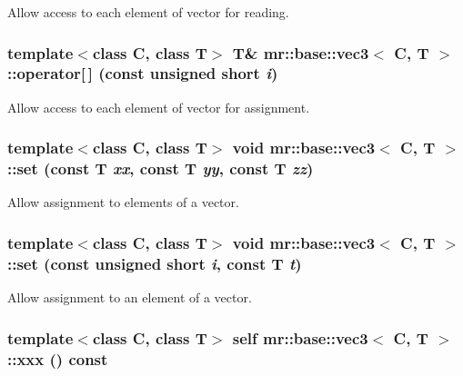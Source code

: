 Allow access to each element of vector for reading. 

\subsubsection{\setlength{\rightskip}{0pt plus 5cm}template$<$class C, class T$>$ T\& {\bf mr::base::vec3}$<$ C, T $>$::operator[$\,$] (const unsigned short {\em i})\hspace{0.3cm}{\tt  [inline]}}\label{structmr_1_1base_1_1vec3_z35_0}


Allow access to each element of vector for assignment. 

\subsubsection{\setlength{\rightskip}{0pt plus 5cm}template$<$class C, class T$>$ void {\bf mr::base::vec3}$<$ C, T $>$::set (const T {\em xx}, const T {\em yy}, const T {\em zz})\hspace{0.3cm}{\tt  [inline]}}\label{structmr_1_1base_1_1vec3_z35_3}


Allow assignment to elements of a vector. 

\subsubsection{\setlength{\rightskip}{0pt plus 5cm}template$<$class C, class T$>$ void {\bf mr::base::vec3}$<$ C, T $>$::set (const unsigned short {\em i}, const T {\em t})\hspace{0.3cm}{\tt  [inline]}}\label{structmr_1_1base_1_1vec3_z35_2}


Allow assignment to an element of a vector. 

\subsubsection{\setlength{\rightskip}{0pt plus 5cm}template$<$class C, class T$>$ {\bf self} {\bf mr::base::vec3}$<$ C, T $>$::xxx () const\hspace{0.3cm}{\tt  [inline]}}\label{structmr_1_1base_1_1vec3_z44_4}


